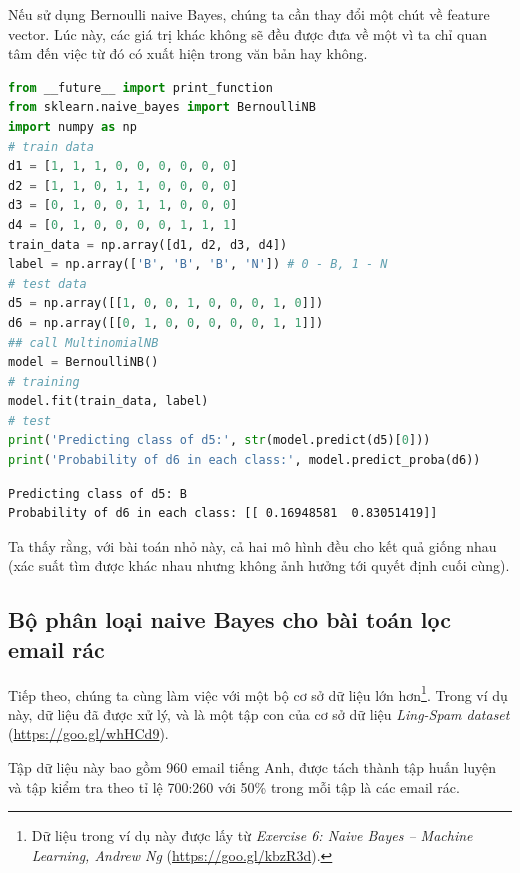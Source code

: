 Nếu sử dụng Bernoulli naive Bayes, chúng ta cần thay đổi một chút về
feature vector. Lúc này, các giá trị khác không sẽ đều được đưa về một vì ta chỉ
quan tâm đến việc từ đó có xuất hiện trong văn bản hay không.
\begin{lstlisting}[language=Python]
from __future__ import print_function 
from sklearn.naive_bayes import BernoulliNB 
import numpy as np  
# train data 
d1 = [1, 1, 1, 0, 0, 0, 0, 0, 0] 
d2 = [1, 1, 0, 1, 1, 0, 0, 0, 0] 
d3 = [0, 1, 0, 0, 1, 1, 0, 0, 0] 
d4 = [0, 1, 0, 0, 0, 0, 1, 1, 1] 
train_data = np.array([d1, d2, d3, d4]) 
label = np.array(['B', 'B', 'B', 'N']) # 0 - B, 1 - N  
# test data 
d5 = np.array([[1, 0, 0, 1, 0, 0, 0, 1, 0]]) 
d6 = np.array([[0, 1, 0, 0, 0, 0, 0, 1, 1]]) 
## call MultinomialNB 
model = BernoulliNB() 
# training  
model.fit(train_data, label) 
# test 
print('Predicting class of d5:', str(model.predict(d5)[0])) 
print('Probability of d6 in each class:', model.predict_proba(d6)) 
\end{lstlisting}
\kq  
\begin{lstlisting}
Predicting class of d5: B 
Probability of d6 in each class: [[ 0.16948581  0.83051419]] 
\end{lstlisting}
 
Ta thấy rằng, với bài toán nhỏ này, cả hai mô hình đều cho kết quả giống nhau (xác suất tìm được khác nhau nhưng không ảnh hưởng tới quyết định cuối cùng).  
 
 
 
\subsection{Bộ phân loại naive Bayes cho bài toán lọc email rác}
Tiếp theo, chúng ta cùng làm việc với một bộ cơ sở dữ liệu lớn hơn\footnote{Dữ liệu trong ví dụ này được lấy từ \textit{Exercise 6: Naive Bayes -- Machine Learning, Andrew Ng} (\url{https://goo.gl/kbzR3d}).}. Trong ví dụ này, dữ liệu đã được xử lý, và là một tập con của cơ sở dữ liệu \textit{Ling-Spam dataset} (\url{https://goo.gl/whHCd9}).  
 
 

Tập dữ liệu này bao gồm 960 email tiếng Anh, được tách thành tập huấn luyện và tập kiểm tra theo tỉ lệ 700:260 với 50\% trong mỗi tập là các email rác.  

